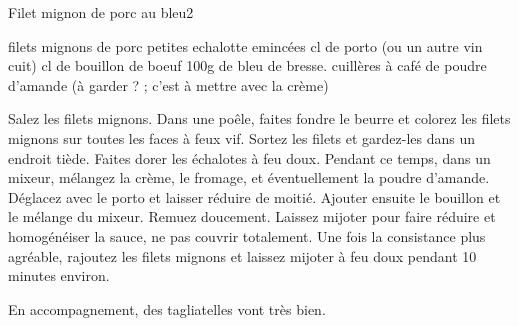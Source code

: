 \begin{recette}{Filet mignon de porc au bleu}{2}{}{}
\begin{ingredients}
 filets mignons de porc
 petites echalotte emincées
 cl de porto (ou un autre vin cuit)
 cl de bouillon de boeuf
\ingredient 100g de bleu de bresse.
 cuillères à café de poudre d'amande (à garder ? ; c'est à mettre avec la crème)
\end{ingredients}

\begin{preparation}
\etape Salez les filets mignons. Dans une poêle, faites fondre le beurre et colorez les filets mignons sur toutes les faces à feux vif. Sortez les filets et gardez-les dans un endroit tiède.
\etape Faites dorer les échalotes à feu doux. Pendant ce temps, dans un mixeur, mélangez la crème, le fromage, et éventuellement la poudre d'amande.
\etape Déglacez avec le porto et laisser réduire de moitié. Ajouter ensuite le bouillon et le mélange du mixeur. Remuez doucement.
\etape Laissez mijoter pour faire réduire et homogénéiser la sauce, ne pas couvrir totalement. 
\etape Une fois la consistance plus agréable, rajoutez les filets mignons et laissez mijoter à feu doux pendant 10 minutes environ.
\end{preparation}

\begin{remarque}
En accompagnement, des tagliatelles vont très bien.
\end{remarque}
\end{recette}

